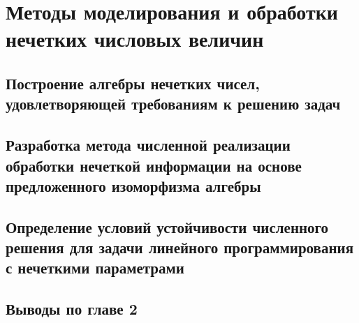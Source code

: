 \chapter{Методы моделирования и обработки нечетких числовых величин}
\label{chapter2}

\section{Построение алгебры нечетких чисел, удовлетворяющей требованиям к решению задач}
\label{chapter2_1}


\section{Разработка метода численной реализации обработки нечеткой информации на основе предложенного изоморфизма алгебры} 
\label{chapter2_2}


\section{Определение условий устойчивости численного решения для задачи линейного программирования с нечеткими параметрами} 
\label{chapter2_3}


\section{Выводы по главе 2} 
\label{chapter2_4}

